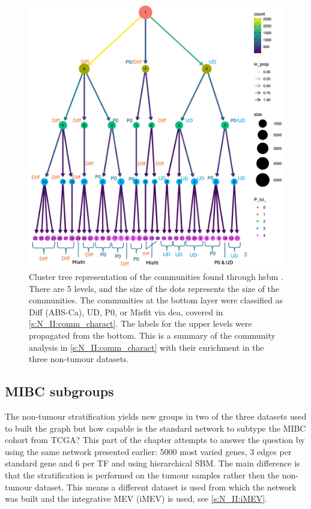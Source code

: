 \begin{figure}[H]    
    \centering
    \includegraphics[width=1.0\textwidth,keepaspectratio]{Sections/Network_II/resources/non_tum/clustertree_labels.png}
    \caption[Cluster tree: healthy and bladder differentiation]{Cluster tree representation of the communities found through \acrshort{hsbm} \citep{Peixoto2014-yb}. There are 5 levels, and the size of the dots represents the size of the communities. The communities at the bottom layer were classified as Diff (ABS-Ca), UD, P0, or Misfit via \acrfull{dea}, covered in \cref{s:N_II:comm_charact}. The labels for the upper levels were propagated from the bottom. This is a summary of the community analysis in \cref{s:N_II:comm_charact} with their enrichment in the three non-tumour datasets.}
    \label{fig:N_II:cluster_tree}
\end{figure}



% 
\subsection{MIBC subgroups} \label{s:N_II:tum_split}

The non-tumour stratification yields new groups in two of the three datasets used to built the graph but how capable is the standard network to subtype the MIBC cohort from TCGA? This part of the chapter attempts to answer the question by using the same network presented earlier: 5000 most varied genes, 3 edges per standard gene and 6 per TF and using hierarchical SBM. The main difference is that the stratification is performed on the tumour samples rather then the non-tumour dataset. This means a different dataset is used from which the network was built and the integrative MEV (iMEV) is used, see \cref{s:N_II:iMEV}.

